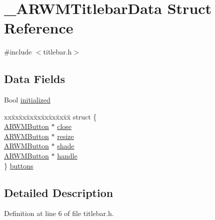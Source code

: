 \hypertarget{struct___a_r_w_m_titlebar_data}{
\section{\_\-ARWMTitlebarData Struct Reference}
\label{struct___a_r_w_m_titlebar_data}
}


{\ttfamily \#include $<$titlebar.h$>$}

\subsection*{Data Fields}
\begin{DoxyCompactItemize}
\item 
Bool \hyperlink{struct___a_r_w_m_titlebar_data_aed6ba0b1d167ae1228cb75353eec8c27}{initialized}
\item 
\begin{tabbing}
xx\=xx\=xx\=xx\=xx\=xx\=xx\=xx\=xx\=\kill
struct \{\\
\>\hyperlink{struct___a_r_w_m_button}{ARWMButton} $\ast$ \hyperlink{struct___a_r_w_m_titlebar_data_a046d5e124dfc10a882e5a3e35f05ac2e}{close}\\
\>\hyperlink{struct___a_r_w_m_button}{ARWMButton} $\ast$ \hyperlink{struct___a_r_w_m_titlebar_data_aec33f1f621f0cf6b9a4033711f9d8247}{resize}\\
\>\hyperlink{struct___a_r_w_m_button}{ARWMButton} $\ast$ \hyperlink{struct___a_r_w_m_titlebar_data_af6d276c5f809297ef5dffa6169b65bf4}{shade}\\
\>\hyperlink{struct___a_r_w_m_button}{ARWMButton} $\ast$ \hyperlink{struct___a_r_w_m_titlebar_data_aef2f069d950e31de4b10ee02989e580d}{handle}\\
\} \hyperlink{struct___a_r_w_m_titlebar_data_aac78798e5857d06801afb7e4ac38cac3}{buttons}\\

\end{tabbing}\end{DoxyCompactItemize}


\subsection{Detailed Description}


Definition at line 6 of file titlebar.h.



